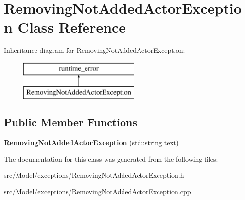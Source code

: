 \hypertarget{classRemovingNotAddedActorException}{}\section{Removing\+Not\+Added\+Actor\+Exception Class Reference}
\label{classRemovingNotAddedActorException}
Inheritance diagram for Removing\+Not\+Added\+Actor\+Exception\+:\begin{figure}[H]
\begin{center}
\leavevmode
\includegraphics[height=2.000000cm]{classRemovingNotAddedActorException}
\end{center}
\end{figure}
\subsection*{Public Member Functions}
\begin{DoxyCompactItemize}
\item 
{\bfseries Removing\+Not\+Added\+Actor\+Exception} (std\+::string text)\hypertarget{classRemovingNotAddedActorException_a758cced3462d38ae6ce2fde2fe92a184}{}\label{classRemovingNotAddedActorException_a758cced3462d38ae6ce2fde2fe92a184}

\end{DoxyCompactItemize}


The documentation for this class was generated from the following files\+:\begin{DoxyCompactItemize}
\item 
src/\+Model/exceptions/Removing\+Not\+Added\+Actor\+Exception.\+h\item 
src/\+Model/exceptions/Removing\+Not\+Added\+Actor\+Exception.\+cpp\end{DoxyCompactItemize}
